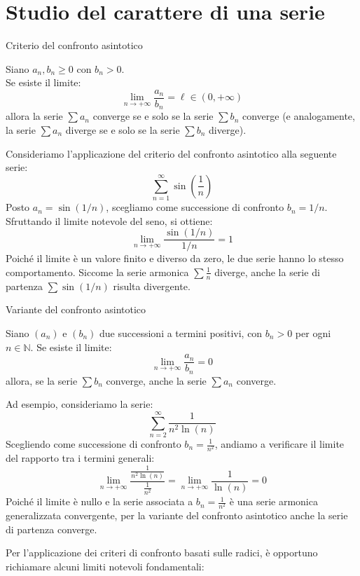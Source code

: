 \documentclass[12pt]{report}
\newcommand{\N}{\mathbb{N}}
\begin{document}
	\section{Studio del carattere di una serie}
	
	\begin{teorema}{Criterio del confronto asintotico}{}
		
		Siano $a_n, b_n \geq 0$ con $b_n > 0$.\\
		Se esiste il limite:
		\[
		\lim_{n \to +\infty} \frac{a_n}{b_n} = \ell \in (0, +\infty)
		\]
		allora la serie $\sum a_n$ converge se e solo se la serie $\sum b_n$ converge (e analogamente, la serie $\sum a_n$ diverge se e solo se la serie $\sum b_n$ diverge).
		
	\end{teorema}
	
	Consideriamo l'applicazione del criterio del confronto asintotico alla seguente serie:
	\[
	\sum_{n=1}^{\infty} \sin\left(\frac{1}{n}\right)
	\]
	Posto $a_n = \sin(1/n)$, scegliamo come successione di confronto $b_n = 1/n$. Sfruttando il limite notevole del seno, si ottiene:
	\[
	\lim_{n \to +\infty} \frac{\sin(1/n)}{1/n} = 1
	\]
	Poiché il limite è un valore finito e diverso da zero, le due serie hanno lo stesso comportamento. Siccome la serie armonica $\sum \frac{1}{n}$ diverge, anche la serie di partenza $\sum \sin(1/n)$ risulta divergente.
	
	\begin{teorema}{Variante del confronto asintotico}{}
		
		Siano $(a_n)$ e $(b_n)$ due successioni a termini positivi, con $b_n > 0$ per ogni $n \in \N$.
		Se esiste il limite:
		\[
		\lim_{n \to +\infty} \frac{a_n}{b_n} = 0
		\]
		allora, se la serie $\sum b_n$ converge, anche la serie $\sum a_n$ converge.
		
	\end{teorema}
	
	Ad esempio, consideriamo la serie:
	\[
	\sum_{n=2}^{\infty} \frac{1}{n^2 \ln(n)}
	\]
	Scegliendo come successione di confronto $b_n = \frac{1}{n^2}$, andiamo a verificare il limite del rapporto tra i termini generali:
	\[
	\lim_{n \to +\infty} \frac{\frac{1}{n^2 \ln(n)}}{\frac{1}{n^2}} = \lim_{n \to +\infty} \frac{1}{\ln(n)} = 0
	\]
	Poiché il limite è nullo e la serie associata a $b_n = \frac{1}{n^2}$ è una serie armonica generalizzata convergente, per la variante del confronto asintotico anche la serie di partenza converge.
	
	Per l'applicazione dei criteri di confronto basati sulle radici, è opportuno richiamare alcuni limiti notevoli fondamentali:
	
\end{document}
